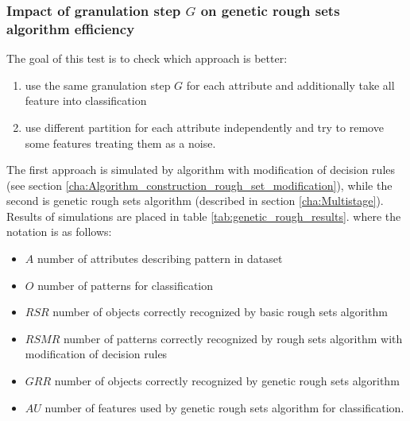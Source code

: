 \subsubsection{Impact of granulation step $G$ on genetic rough sets algorithm efficiency}
\label{cha:Simulation_reaearch_4}
The goal of this test is to check which approach is better:
\begin{enumerate}
    \item use the same granulation step $G$ for each attribute and additionally
        take all feature into classification
    \item use different partition for each attribute independently and try to
        remove some features treating them as a noise.
\end{enumerate}
The first approach is simulated by algorithm with modification of decision
rules (see section \ref{cha:Algorithm_construction_rough_set_modification}), 
while the second is genetic rough sets algorithm (described in section
\ref{cha:Multistage}). Results of simulations are placed in table \ref{tab:genetic_rough_results}.
where the notation is as follows:
\begin{itemize}
    \item $A$ number of attributes describing pattern in dataset
    \item $O$ number of patterns for classification
    \item $RSR$ number of objects correctly recognized by basic rough sets
        algorithm
    \item $RSMR$ number of patterns correctly recognized by rough sets
        algorithm with modification of decision rules
    \item $GRR$ number of objects correctly recognized by genetic rough sets
        algorithm
    \item $AU$ number of features used by genetic rough sets algorithm for
        classification.
\end{itemize}

